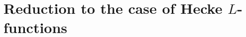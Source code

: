 \documentclass[./main]{subfiles}
\begin{document}
\section{Reduction to the case of Hecke \texorpdfstring{$L$}{L}-functions}
\end{document}
